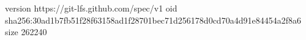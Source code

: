 version https://git-lfs.github.com/spec/v1
oid sha256:30ad1b7fb51f28f63158ad1f28701bec71d256178d0cd70a4d91e84454a2f8a6
size 262240
